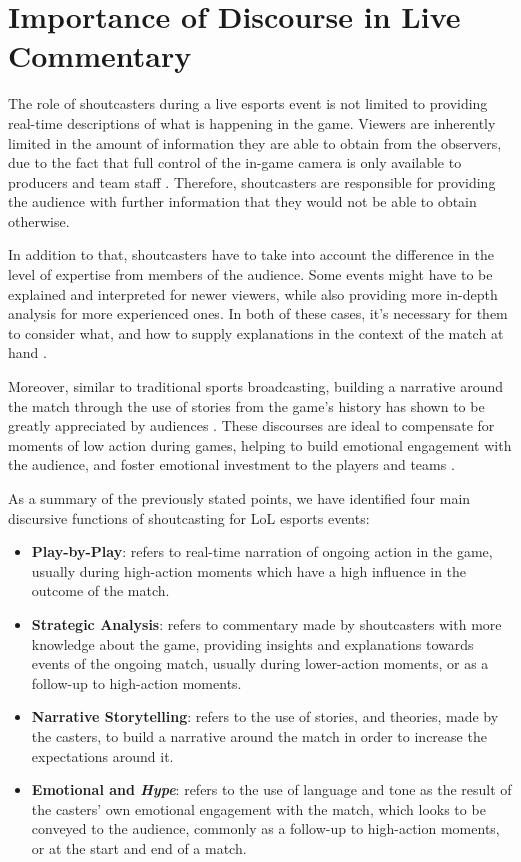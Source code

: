 \section{Importance of Discourse in Live Commentary}
\label{sec:importance_of_discourse}

The role of shoutcasters during a live esports event is not limited to providing real-time descriptions of what is happening in the game. Viewers are inherently limited in the amount of information they are able to obtain from the observers, due to the fact that full control of the in-game camera is only available to producers and team staff \cite{cheung2011starcraft}. Therefore, shoutcasters are responsible for providing the audience with further information that they would not be able to obtain otherwise.

\medskip 

In addition to that, shoutcasters have to take into account the difference in the level of expertise from members of the audience. Some events might have to be explained and interpreted for newer viewers, while also providing more in-depth analysis for more experienced ones. In both of these cases, it's necessary for them to consider what, and how to supply explanations in the context of the match at hand \cite{penney2021shoutcasters}. 

\medskip

Moreover, similar to traditional sports broadcasting, building a narrative around the match through the use of stories from the game's history has shown to be greatly appreciated by audiences \cite{lee2014automated,smith1997storytellers}. These discourses are ideal to compensate for moments of low action during games, helping to build emotional engagement with the audience, and foster emotional investment to the players and teams \cite{ryan1993narrative}. 
\medskip

As a summary of the previously stated points, we have identified four main discursive functions of shoutcasting for LoL esports events:

\begin{itemize}
  \item \textbf{Play-by-Play}: refers to real-time narration of ongoing action in the game, usually during high-action moments which have a high influence in the outcome of the match.
  \item \textbf{Strategic Analysis}: refers to commentary made by shoutcasters with more knowledge about the game, providing insights and explanations towards events of the ongoing match, usually during lower-action moments, or as a follow-up to high-action moments.
  \item \textbf{Narrative Storytelling}: refers to the use of stories, and theories, made by the casters, to build a narrative around the match in order to increase the expectations around it.
  \item \textbf{Emotional and \textit{Hype}}: refers to the use of language and tone as the result of the casters' own emotional engagement with the match, which looks to be conveyed to the audience, commonly as a follow-up to high-action moments, or at the start and end of a match.
\end{itemize}


